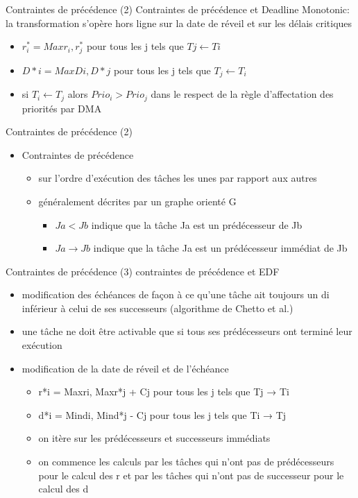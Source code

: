 \begin{frame}{Contraintes de précédence (2)} 
  Contraintes de  précédence et Deadline  Monotonic: la transformation
  s'opère hors ligne sur la date de réveil et sur les délais critiques
  \begin{itemize}
  \item $r^*_i = Max{r_i, r^*_j}$ pour tous les j tels que $Tj \leftarrow Ti$
  \item $D*i = Max{Di, D*j}$ pour tous les j tels que $T_j \leftarrow  T_i$
  \item  si $T_i  \leftarrow  T_j$  alors $Prio_i  >  Prio_j$ dans  le
    respect de la règle d'affectation des priorités par DMA
  \end{itemize} 
\end{frame} 

\begin{frame}{Contraintes de précédence (2)} 
  \begin{itemize}
  \item Contraintes de précédence 
    \begin{itemize}
    \item sur l'ordre d'exécution des  tâches les unes par rapport aux
      autres
    \item généralement décrites par un graphe orienté G 
      \begin{itemize}
      \item $Ja < Jb$ indique que la tâche Ja est un prédécesseur de Jb 
      \item $Ja → Jb$ indique que la tâche Ja est un prédécesseur immédiat de Jb 
      \end{itemize}
    \end{itemize}
  \end{itemize}
\end{frame}

\begin{frame}{Contraintes de précédence (3)} 
  contraintes de précédence et EDF
  \begin{itemize}
  \item modification des échéances de façon à ce qu'une tâche ait toujours un di inférieur à celui de ses successeurs (algorithme de Chetto et al.)
  \item une tâche ne doit être activable que si tous ses prédécesseurs ont terminé leur exécution 
  \item modification de la date de réveil et de l'échéance
    \begin{itemize}
    \item  r*i = Max{ri, Max{r*j + Cj}} pour tous les j tels que Tj → Ti
    \item d*i = Min{di, Min{d*j - Cj}} pour tous les j tels que Ti → Tj
    \item on itère sur les prédécesseurs et successeurs immédiats
    \item on commence les calculs par les tâches qui n'ont pas de prédécesseurs pour le calcul des r et par les tâches qui n'ont pas de successeur pour le calcul des d
    \end{itemize}
  \end{itemize}
\end{frame}

